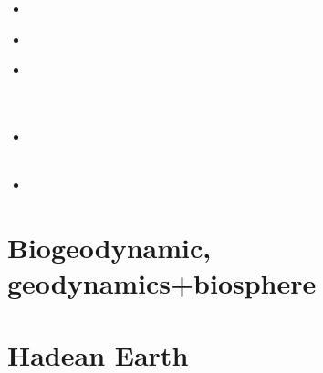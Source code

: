 \begin{scriptsize}
\begin{itemize}
 \\
\item[\twothousandseventeen]
\item[\twothousandeighteen] 
 \\
\item[\twothousandnineteen] 
 \\
 \\
 \\
\item[\twothousandtwenty] 
 \\
 \\
\item[\twothousandtwentyfour] 
\end{itemize}
\end{scriptsize}


\section{Biogeodynamic, geodynamics+biosphere}



\section{Hadean Earth}

